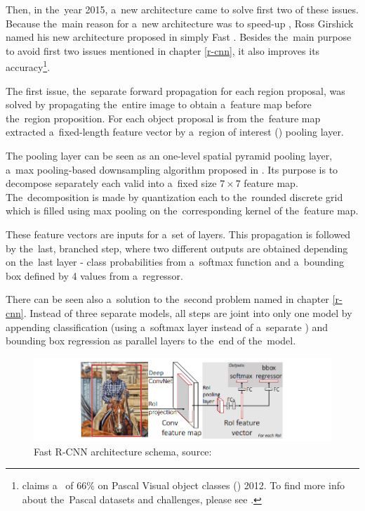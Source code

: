 Then, in the~year 2015, a~new architecture came to solve first two of these issues. 
Because the~main reason for a~new architecture was to speed-up , Ross 
Girshick named his new architecture proposed in \cite{fast-rcnn} simply Fast 
. Besides the~main purpose to avoid first two issues mentioned in 
chapter \ref{r-cnn}, it also improves its accuracy\footnote{\cite{fast-rcnn} 
claims a~ of $66 \%$ on Pascal Visual object classes () 2012. To 
find more info about the~Pascal  datasets and challenges, please see 
\cite{voc}.}.

The first issue, the~separate forward propagation for each region proposal, was 
solved by propagating the~entire image to obtain a~feature map before the~region 
proposition. For each object proposal is from the~feature map extracted
a~fixed-length feature vector by a~region of interest () pooling layer.

The  pooling layer can be seen as an one-level spatial pyramid pooling 
layer, a~max pooling-based downsampling algorithm proposed in \cite{spp}. Its 
purpose is to decompose separately each valid  into a~fixed size $7 
\times 7$ feature map. The~decomposition is made by quantization each  
to the~rounded discrete grid which is filled using max pooling on
the~corresponding kernel of the~feature map.

These feature vectors are inputs for a~set of  layers. This propagation 
is followed by the~last, branched step, where two different outputs are obtained 
depending on the~last layer - class probabilities from a~softmax function and
a~bounding box defined by 4 values from a~regressor.

There can be seen also a~solution to the~second problem named in chapter 
\ref{r-cnn}. Instead of three separate models, all steps are joint into only one 
model by appending classification (using a~softmax layer instead of a~separate 
) and bounding box regression as parallel layers to the~end of
the~model.

\begin{figure}[H]
   \centering
	\includegraphics[width=.9\linewidth]{./pictures/fastrcnn.png}
	\caption[Fast R-CNN architecture]{Fast R-CNN architecture schema, source: 
\cite{fast-rcnn}}
      \label{fig:fast-rcnn}
\end{figure}


